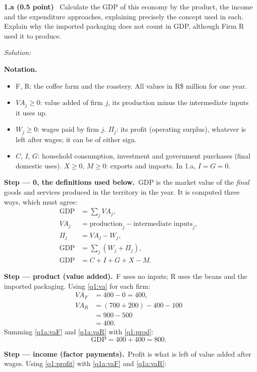 \documentclass[11pt,a4paper]{article}
\newif\ifsolucoes
\newcommand{\sub}[2]{\Needspace{8\baselineskip}\par\medskip\noindent\textbf{#1 (#2)}~}
\newcommand{\resolespaco}[1][6cm]{\ifsolucoes\else\par\textit{Solution:}\vspace{#1}\par\fi}
\newcommand{\passo}[2]{\par\smallskip\noindent\textbf{Step --- #1.}~#2}
\newenvironment{notacao}{\par\smallskip\noindent\textbf{Notation.}\begin{itemize}[leftmargin=1.4em,topsep=1pt,itemsep=0pt]\small}{\end{itemize}}
\begin{document}
\sub{1.a}{0.5 point} Calculate the GDP of this economy by the product, the income and the
expenditure approaches, explaining precisely the concept used in each. Explain why the imported
packaging does not count in GDP, although Firm R used it to produce.
\resolespaco[5.5cm]
\begin{sol}
\begin{notacao}
\item F, R: the coffee farm and the roastery. All values in R\$ million for one year.
\item $VA_j\ge0$: value added of firm $j$, its production minus the intermediate inputs it uses up.
\item $W_j\ge0$: wages paid by firm $j$. $\Pi_j$: its profit (operating surplus), whatever is left
after wages; it can be of either sign.
\item $C$, $I$, $G$: household consumption, investment and government purchases (final domestic
uses). $X\ge0$, $M\ge0$: exports and imports. In 1.a, $I=G=0$.
\end{notacao}
\passo{0, the definitions used below}{GDP is the market value of the \emph{final} goods and
services produced in the territory in the year. It is computed three ways, which must agree:}
\begin{align}
\text{GDP} &= \textstyle\sum_j VA_j, \label{q1:prod}\\
VA_j &= \text{production}_j-\text{intermediate inputs}_j, \label{q1:va}\\
\Pi_j &= VA_j-W_j, \label{q1:profit}\\
\text{GDP} &= \textstyle\sum_j (W_j+\Pi_j), \label{q1:inc}\\
\text{GDP} &= C+I+G+X-M. \label{q1:exp}
\end{align}
\passo{product (value added)}{F uses no inputs; R uses the beans and the imported packaging.
Using \eqref{q1:va} for each firm:}
\begin{align}
VA_F &= 400-0=400, \label{q1a:vaF}\\
VA_R &= (700+200)-400-100\nonumber\\
&= 900-500\nonumber\\
&= 400. \label{q1a:vaR}
\end{align}
Summing \eqref{q1a:vaF} and \eqref{q1a:vaR} with \eqref{q1:prod}:
\begin{equation}
\text{GDP}=400+400=\boxed{800}. \label{q1a:gdp}
\end{equation}
\passo{income (factor payments)}{Profit is what is left of value added after wages. Using
\eqref{q1:profit} with \eqref{q1a:vaF} and \eqref{q1a:vaR}:}

\end{sol}
\end{document}
